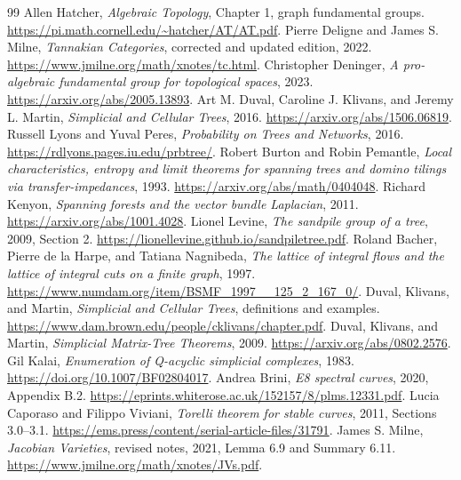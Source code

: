 \documentclass[11pt]{article}
\theoremstyle{definition}
\theoremstyle{remark}
\begin{document}
\begin{thebibliography}{99}
 Allen Hatcher, \emph{Algebraic Topology}, Chapter 1, graph fundamental groups. \url{https://pi.math.cornell.edu/~hatcher/AT/AT.pdf}.
 Pierre Deligne and James S. Milne, \emph{Tannakian Categories}, corrected and updated edition, 2022. \url{https://www.jmilne.org/math/xnotes/tc.html}.
 Christopher Deninger, \emph{A pro-algebraic fundamental group for topological spaces}, 2023. \url{https://arxiv.org/abs/2005.13893}.
 Art M. Duval, Caroline J. Klivans, and Jeremy L. Martin, \emph{Simplicial and Cellular Trees}, 2016. \url{https://arxiv.org/abs/1506.06819}.
 Russell Lyons and Yuval Peres, \emph{Probability on Trees and Networks}, 2016. \url{https://rdlyons.pages.iu.edu/prbtree/}.
 Robert Burton and Robin Pemantle, \emph{Local characteristics, entropy and limit theorems for spanning trees and domino tilings via transfer-impedances}, 1993. \url{https://arxiv.org/abs/math/0404048}.
 Richard Kenyon, \emph{Spanning forests and the vector bundle Laplacian}, 2011. \url{https://arxiv.org/abs/1001.4028}.
 Lionel Levine, \emph{The sandpile group of a tree}, 2009, Section 2. \url{https://lionellevine.github.io/sandpiletree.pdf}.
 Roland Bacher, Pierre de la Harpe, and Tatiana Nagnibeda, \emph{The lattice of integral flows and the lattice of integral cuts on a finite graph}, 1997. \url{https://www.numdam.org/item/BSMF_1997__125_2_167_0/}.
 Duval, Klivans, and Martin, \emph{Simplicial and Cellular Trees}, definitions and examples. \url{https://www.dam.brown.edu/people/cklivans/chapter.pdf}.
 Duval, Klivans, and Martin, \emph{Simplicial Matrix-Tree Theorems}, 2009. \url{https://arxiv.org/abs/0802.2576}.
 Gil Kalai, \emph{Enumeration of Q-acyclic simplicial complexes}, 1983. \url{https://doi.org/10.1007/BF02804017}.
 Andrea Brini, \emph{E8 spectral curves}, 2020, Appendix B.2. \url{https://eprints.whiterose.ac.uk/152157/8/plms.12331.pdf}.
 Lucia Caporaso and Filippo Viviani, \emph{Torelli theorem for stable curves}, 2011, Sections 3.0--3.1. \url{https://ems.press/content/serial-article-files/31791}.
 James S. Milne, \emph{Jacobian Varieties}, revised notes, 2021, Lemma 6.9 and Summary 6.11. \url{https://www.jmilne.org/math/xnotes/JVs.pdf}.

\end{thebibliography}
\end{document}
